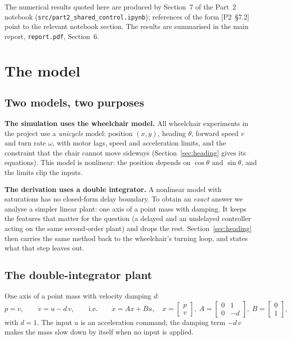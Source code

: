 \documentclass[11pt,a4paper]{article}
\newcommand{\ptwo}[1]{{\small\textsf{[P2~\S#1]}}}
\newcommand{\code}[1]{\texttt{#1}}
\theoremstyle{definition}
\begin{document}
The numerical results quoted here are produced by Section~7 of the Part~2
notebook (\code{src/part2\_shared\_control.ipynb}); references of the
form \ptwo{7.2} point to the relevant notebook section. The results are
summarised in the main report, \code{report.pdf}, Section~6.

\section{The model}
\label{sec:model}

\subsection{Two models, two purposes}

\textbf{The simulation uses the wheelchair model.} All wheelchair
experiments in the project use a \emph{unicycle} model: position
$(x,y)$, heading $\theta$, forward speed $v$ and turn rate $\omega$,
with motor lags, speed and acceleration limits, and the constraint that
the chair cannot move sideways (Section~\ref{sec:heading} gives its
equations). This model is nonlinear: the position depends on
$\cos\theta$ and $\sin\theta$, and the limits clip the inputs.

\textbf{The derivation uses a double integrator.} A nonlinear model with
saturations has no closed-form delay boundary. To obtain an \emph{exact}
answer we analyse a simpler linear plant: one axis of a point mass with
damping. It keeps the features that matter for the question (a delayed
and an undelayed controller acting on the same second-order plant) and
drops the rest. Section~\ref{sec:heading} then carries the same method
back to the wheelchair's turning loop, and states what that step
leaves out.

\subsection{The double-integrator plant}

One axis of a point mass with velocity damping $d$:
\begin{equation}
\dot p = v, \qquad \dot v = u - d\,v ,
\qquad\text{i.e.}\qquad
\dot x = A x + B u,\quad
x = \begin{bmatrix} p\\ v\end{bmatrix},\;
A = \begin{bmatrix} 0 & 1\\ 0 & -d\end{bmatrix},\;
B = \begin{bmatrix} 0\\ 1\end{bmatrix},
\label{eq:plant}
\end{equation}
with $d = 1$. The input $u$ is an acceleration command; the damping term
$-d\,v$ makes the mass slow down by itself when no input is applied.
\end{document}
